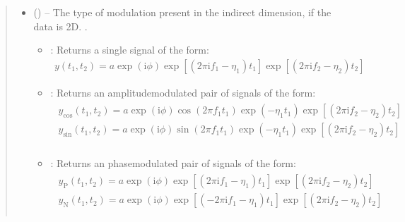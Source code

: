 \documentclass[letterpaper,10pt,english]{sphinxmanual}
\begin{document}
\begin{fulllineitems}
\begin{quote}
\begin{description}
\begin{itemize}
\item {} 
\sphinxAtStartPar
{} (\sphinxstyleliteralemphasis{\sphinxupquote{, }}\sphinxstyleliteralemphasis{\sphinxupquote{, }}\sphinxstyleliteralemphasis{\sphinxupquote{, }}) – 
\sphinxAtStartPar
The type of modulation present in the indirect dimension, if the data
is 2D. .
\begin{itemize}
\item {} 
\sphinxAtStartPar
{}: Returns a single signal of the form:
\begin{equation*}
\begin{split}y(t_1, t_2) = a \exp(\mathrm{i} \phi)
\exp \left[ \left( 2 \pi \mathrm{i} f_1 - \eta_1 \right)
t_1 \right]
\exp \left[ \left( 2 \pi \mathrm{i} f_2 - \eta_2 \right)
t_2 \right]\end{split}
\end{equation*}
\item {} 
\sphinxAtStartPar
{}: Returns an amplitude\sphinxhyphen{}modulated pair of signals of the form:
\begin{align*}\!\begin{aligned}
y_{\mathrm{cos}}(t_1, t_2) = a \exp(\mathrm{i} \phi)
\cos \left( 2 \pi f_1 t_1 \right)
\exp \left( - \eta_1 t_1 \right)
\exp \left[ \left( 2 \pi \mathrm{i} f_2 - \eta_2 \right)
t_2 \right]\\
y_{\mathrm{sin}}(t_1, t_2) = a \exp(\mathrm{i} \phi)
\sin \left( 2 \pi f_1 t_1 \right)
\exp \left( - \eta_1 t_1 \right)
\exp \left[ \left( 2 \pi \mathrm{i} f_2 - \eta_2 \right)
t_2 \right]\\
\end{aligned}\end{align*}
\item {} 
\sphinxAtStartPar
{}: Returns an phase\sphinxhyphen{}modulated pair of signals of the form:
\begin{align*}\!\begin{aligned}
y_{\mathrm{P}}(t_1, t_2) = a \exp(\mathrm{i} \phi)
\exp \left[ \left( 2 \pi \mathrm{i} f_1 - \eta_1 \right)
t_1 \right]
\exp \left[ \left( 2 \pi \mathrm{i} f_2 - \eta_2 \right)
t_2 \right]\\
y_{\mathrm{N}}(t_1, t_2) = a \exp(\mathrm{i} \phi)
\exp \left[ \left( - 2 \pi \mathrm{i} f_1 - \eta_1 \right)
t_1 \right]
\exp \left[ \left( 2 \pi \mathrm{i} f_2 - \eta_2 \right)
t_2 \right]\\
\end{aligned}\end{align*}
\end{itemize}



\end{itemize}
\end{description}
\end{quote}
\end{fulllineitems}
\end{document}
